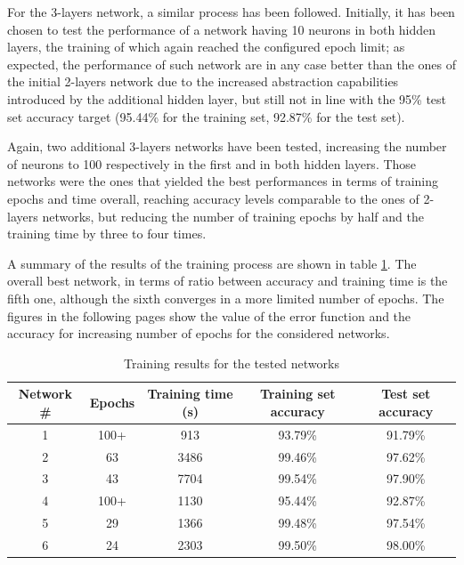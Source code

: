 \documentclass[letterpaper,headings=standardclasses]{scrartcl}
\begin{document}
For the 3-layers network, a similar process has been followed. Initially, it has been chosen to test the performance of a network having 10 neurons in both hidden layers, the training of which again reached the configured epoch limit; as expected, the performance of such network are in any case better than the ones of the initial 2-layers network due to the increased abstraction capabilities introduced by the additional hidden layer, but still not in line with the 95\% test set accuracy target (95.44\% for the training set, 92.87\% for the test set).

Again, two additional 3-layers networks have been tested, increasing the number of neurons to 100 respectively in the first and in both hidden layers. Those networks were the ones that yielded the best performances in terms of training epochs and time overall, reaching accuracy levels comparable to the ones of 2-layers networks, but reducing the number of training epochs by half and the training time by three to four times.

A summary of the results of the training process are shown in table \ref{net_results}. The overall best network, in terms of ratio between accuracy and training time is the fifth one, although the sixth converges in a more limited number of epochs. The figures in the following pages show the value of the error function and the accuracy for increasing number of epochs for the considered networks.

\begin{table}[H]
    \centering
    \begin{tabular}{|c|c|c|c|c|}
    \hline
    Network \# & Epochs & Training time (s) & Training set accuracy & Test set accuracy \\ \hline
    1 & 100+ & 913 & 93.79\% & 91.79\% \\ \hline
    2 & 63 & 3486 & 99.46\% & 97.62\% \\ \hline
    3 & 43 & 7704 & 99.54\% & 97.90\% \\ \hline
    4 & 100+ & 1130 & 95.44\% & 92.87\% \\ \hline
    5 & 29 & 1366 & 99.48\% & 97.54\% \\ \hline
    6 & 24 & 2303 & 99.50\% & 98.00\% \\ \hline
    \end{tabular}
    \caption{Training results for the tested networks}
    \label{net_results}
\end{table}

\end{document}

